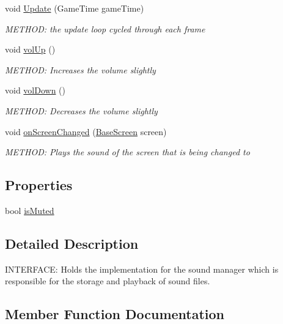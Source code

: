 \begin{DoxyCompactItemize}
void \hyperlink{a00482_af7ddcb52a6283aa2cf4392c75d2a0cff}{Update} (Game\+Time game\+Time)
\begin{DoxyCompactList}\small\item\em M\+E\+T\+H\+OD\+: the update loop cycled through each frame \end{DoxyCompactList}\item 
void \hyperlink{a00482_afe3eaaed21c8b64692bc338309ac4a4d}{vol\+Up} ()
\begin{DoxyCompactList}\small\item\em M\+E\+T\+H\+OD\+: Increases the volume slightly \end{DoxyCompactList}\item 
void \hyperlink{a00482_a96629b32d608ca84fe1a3624bece7f05}{vol\+Down} ()
\begin{DoxyCompactList}\small\item\em M\+E\+T\+H\+OD\+: Decreases the volume slightly \end{DoxyCompactList}\item 
void \hyperlink{a00482_a8aa47dcffde058c1146f7ebf5b0edb84}{on\+Screen\+Changed} (\hyperlink{a00550}{Base\+Screen} screen)
\begin{DoxyCompactList}\small\item\em M\+E\+T\+H\+OD\+: Plays the sound of the screen that is being changed to \end{DoxyCompactList}\end{DoxyCompactItemize}
\subsection*{Properties}
\begin{DoxyCompactItemize}
\item 
bool \hyperlink{a00482_ac8a262a7db42a3802a58c9a7e0a471ca}{is\+Muted}
\end{DoxyCompactItemize}


\subsection{Detailed Description}
I\+N\+T\+E\+R\+F\+A\+CE\+: Holds the implementation for the sound manager which is responsible for the storage and playback of sound files. 



\subsection{Member Function Documentation}
\mbox{\label{a00482_a02f14f3401f425a686a50e6b6a40aca7}} 
